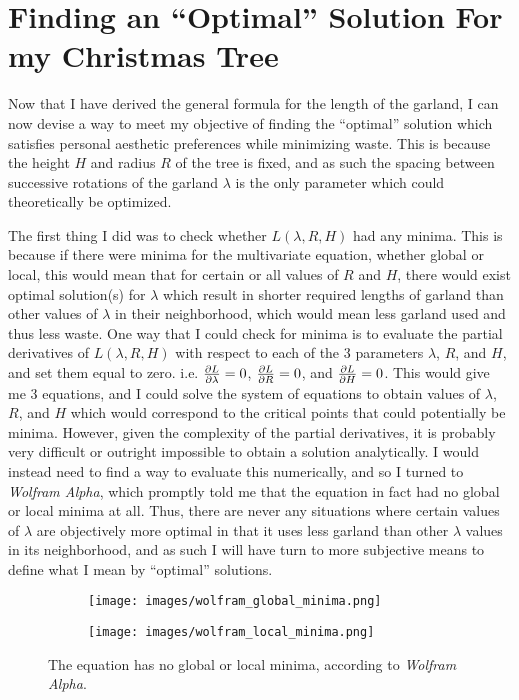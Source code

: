 \section{Finding an ``Optimal'' Solution For my Christmas Tree}

Now that I have derived the general formula for the length of the garland, I can now devise a way to meet my objective of finding the ``optimal'' solution which satisfies personal aesthetic preferences while minimizing waste. This is because the height $H$ and radius $R$ of the tree is fixed, and as such the spacing between successive rotations of the garland $\lambda$ is the only parameter which could theoretically be optimized.

The first thing I did was to check whether $L(\lambda, R, H)$ had any minima. This is because if there were minima for the multivariate equation, whether global or local, this would mean that for certain or all values of $R$ and $H$, there would exist optimal solution(s) for $\lambda$ which result in shorter required lengths of garland than other values of $\lambda$ in their neighborhood, which would mean less garland used and thus less waste. One way that I could check for minima is to evaluate the partial derivatives of $L(\lambda, R, H)$ with respect to each of the 3 parameters $\lambda$, $R$, and $H$, and set them equal to zero. i.e. $\pdv{L}{\lambda} = 0$, $\pdv{L}{R} = 0$, and $\pdv{L}{H} = 0$. This would give me 3 equations, and I could solve the system of equations to obtain values of $\lambda$, $R$, and $H$ which would correspond to the critical points that could potentially be minima. However, given the complexity of the partial derivatives, it is probably very difficult or outright impossible to obtain a solution analytically. I would instead need to find a way to evaluate this numerically, and so I turned to \emph{Wolfram Alpha}, which promptly told me that the equation in fact had no global or local minima at all.  Thus, there are never any situations where certain values of $\lambda$ are objectively more optimal in that it uses less garland than other $\lambda$ values in its neighborhood, and as such I will have turn to more subjective means to define what I mean by ``optimal'' solutions.
\begin{figure}[H]
    \centering
    \begin{subfigure}[t]{0.7\textwidth}
        \centering
        \texttt{[image: images/wolfram\_global\_minima.png]}
    \end{subfigure}
\end{figure}
\begin{figure}[H]\ContinuedFloat
    \centering
    \begin{subfigure}[t]{0.7\textwidth}
        \centering
        \texttt{[image: images/wolfram\_local\_minima.png]}
    \end{subfigure}
    \caption{The equation has no global or local minima, according to \emph{Wolfram Alpha}.}
    \vspace*{-10pt}
\end{figure}

